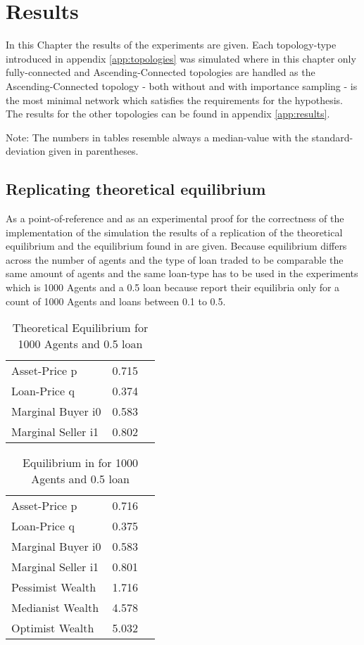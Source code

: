 \documentclass[Bachelorarbeit.tex]{subfiles}
\begin{document}
\graphicspath{{./figures/results/}}	%

\chapter{Results}
\label{ch:results}

In this Chapter the results of the experiments are given. Each topology-type introduced in appendix \ref{app:topologies} was simulated where in this chapter only fully-connected and Ascending-Connected topologies are handled as the Ascending-Connected topology - both without and with importance sampling - is the most minimal network which satisfies the requirements for the hypothesis. 
The results for the other topologies can be found in appendix \ref{app:results}.

Note: The numbers in tables resemble always a median-value with the standard-deviation given in parentheses.

\section{Replicating theoretical equilibrium}
As  a point-of-reference and as an experimental proof for the correctness of the implementation of the simulation the results of a replication of the theoretical equilibrium and the equilibrium found in \cite{Breuer2015} are given.
Because equilibrium differs across the number of agents and the type of loan traded to be comparable the same amount of agents and the same loan-type has to be used in the experiments which is 1000 Agents and a 0.5 loan because \cite{Breuer2015} report their equilibria only for a count of 1000 Agents and loans between 0.1 to 0.5.

\begin{table}[H]
	\centering
	\caption{Theoretical Equilibrium for 1000 Agents and 0.5 loan}
	\begin{tabular} { l c r }
		\hline
		Asset-Price p & 0.715 \\
		Loan-Price q & 0.374 \\
		Marginal Buyer i0 & 0.583 \\
		Marginal Seller i1 & 0.802 \\
		\hline
	\end{tabular}
\end{table}


\begin{table}[H]
	\centering
	\caption{Equilibrium in \cite{Breuer2015} for 1000 Agents and 0.5 loan }
	\begin{tabular} { l c r }
		\hline
		Asset-Price p & 0.716 \\
		Loan-Price q & 0.375 \\
		Marginal Buyer i0 & 0.583 \\
		Marginal Seller i1 & 0.801 \\
		\hline
		Pessimist Wealth & 1.716 \\
		Medianist Wealth & 4.578 \\
		Optimist Wealth & 5.032 \\
		\hline
	\end{tabular}
\end{table}
\end{document}
